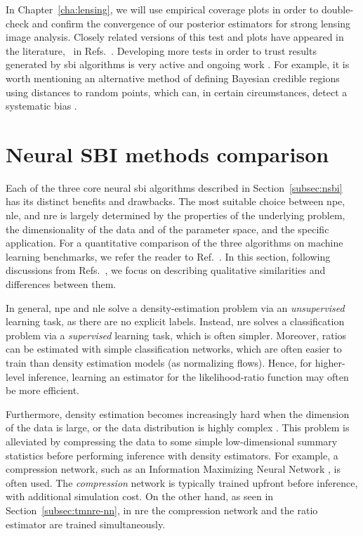 In Chapter~\ref{cha:lensing}, we will use empirical coverage plots in order to double-check and confirm the convergence of our posterior estimators for strong lensing image analysis. Closely related versions of this test and plots have appeared in the literature, \eg~in Refs.~\cite{Dax:2021tsq,Karchev:2022xyn, Bhardwaj:2023xph}. Developing more tests in order to trust results generated by \gls*{sbi} algorithms is very active and ongoing work \cite{linhart2024c2st, lemos2023sampling}. For example, it is worth mentioning an alternative method of defining Bayesian credible regions using distances to random points, which can, in certain circumstances, detect a systematic bias \cite{lemos2023sampling}.


\section{Neural SBI methods comparison} \label{sec:comparison}

Each of the three core neural \gls*{sbi} algorithms described in Section~\ref{subsec:nsbi} has its distinct benefits and drawbacks. The most suitable choice between \gls*{npe}, \gls*{nle}, and \gls*{nre} is largely determined by the properties of the underlying problem, the dimensionality of the data and of the parameter space, and the specific application. For a quantitative comparison of the three algorithms on machine learning benchmarks, we refer the reader to Ref.~\cite{Lueckmann:2021aa}. In this section, following discussions from Refs.~\cite{Cranmer:2019eaq, Cole:2021gwr, Ho:2024whi}, we focus on describing qualitative similarities and differences between them.

In general, \gls*{npe} and \gls*{nle} solve a density-estimation problem via an \emph{unsupervised} learning task, as there are no explicit labels. Instead, \gls*{nre} solves a classification problem via a \emph{supervised} learning task, which is often simpler. Moreover, ratios can be estimated with simple classification networks, which are often easier to train than density estimation models (as normalizing flows). Hence, for higher-level inference, learning an estimator for the likelihood-ratio function may often be more efficient.

Furthermore, density estimation becomes increasingly hard when the dimension of the data is large, or the data distribution is highly complex \cite{papamakarios2021normalizing}. This problem is alleviated by compressing the data to some simple low-dimensional summary statistics before performing inference with density estimators. For example, a compression network, such as an Information Maximizing Neural Network \cite{charnock2018automatic}, is often used. The \emph{compression} network is typically trained upfront before inference, with additional simulation cost. On the other hand, as seen in Section~\ref{subsec:tmnre-nn}, in \gls*{nre} the compression network and the ratio estimator are trained simultaneously.    	 


